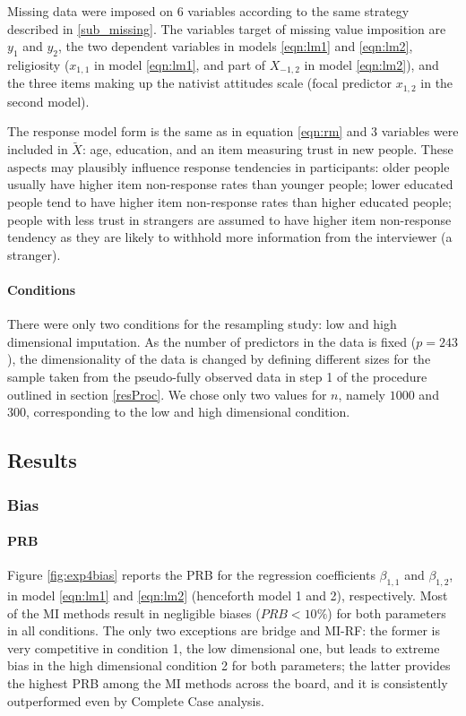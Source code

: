 	Missing data were imposed on 6 variables according to the same strategy described in \ref{sub_missing}.
	The variables target of missing value imposition are $y_1$ and $y_2$, the two dependent variables in models 
	\ref{eqn:lm1} and \ref{eqn:lm2}, religiosity ($x_{1,1}$ in model \ref{eqn:lm1}, and part of $X_{-1,2}$ in 
	model \ref{eqn:lm2}), and the three items making up the nativist attitudes scale (focal predictor $x_{1,2}$ 
	in the second model).

	The response model form is the same as in equation \ref{eqn:rm} and 3 variables were included in $\tilde{X}$: 
	age, education, and an item measuring trust in new people. 
	These aspects may plausibly influence response tendencies in participants: 
	older people usually have higher item non-response rates than younger people;
	lower educated people tend to have higher item non-response rates than higher educated people;
	people with less trust in strangers are assumed to have higher item non-response tendency as they
	are likely to withhold more information from the interviewer (a stranger).

\paragraph{Conditions}
	There were only two conditions for the resampling study: low and high dimensional imputation.
	As the number of predictors in the data is fixed ($p = 243$), the dimensionality of the data is
	changed by defining different sizes for the sample taken from the pseudo-fully observed data in
	step 1 of the procedure outlined in section \ref{resProc}.
	We chose only two values for $n$, namely $1000$ and $300$, corresponding to the low and high 
	dimensional condition.

\subsection{Results}
\subsubsection{Bias}

	\paragraph{PRB}
	Figure \ref{fig:exp4bias} reports the PRB for the regression coefficients $\beta_{1,1}$ and $\beta_{1,2}$, 
	in model \ref{eqn:lm1} and \ref{eqn:lm2} (henceforth model 1 and 2), respectively.
	Most of the MI methods result in negligible biases ($PRB < 10\%$) for both parameters in all conditions.
	The only two exceptions are bridge and MI-RF: 
	the former is very competitive in condition 1, the low dimensional one, but leads to extreme bias in 
	the high dimensional condition 2 for both parameters; 
	the latter provides the highest PRB among the MI methods across the board, and it is consistently outperformed 
	even by Complete Case analysis.


